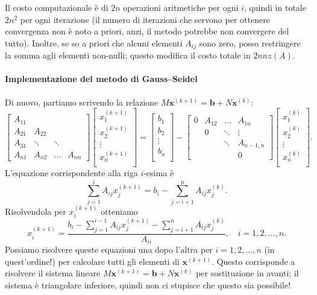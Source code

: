 \documentclass[a4paper]{report}
\theoremstyle{definiton}
\theoremstyle{remark}
\newcommand{\x}{\mathbf{x}}
\renewcommand{\b}{\mathbf{b}}
\begin{document}
Il costo computazionale è di $2n$ operazioni aritmetiche per ogni $i$, quindi in totale $2n^2$ per ogni iterazione (il numero di iterazioni che servono per ottenere convergenza non è noto a priori, anzi, il metodo potrebbe non convergere del tutto). Inoltre, se
 so a priori che alcuni elementi $A_{ij}$ sono zero, posso restringere la somma agli elementi non-nulli; questo modifica il costo totale in $2nnz(A)$.

\paragraph{Implementazione del metodo di Gauss--Seidel}

Di nuovo, partiamo scrivendo la relazione $M\x^{(k+1)} = \b + N\x^{(k)}$:
\[
\begin{bmatrix}
    A_{11}\\
    A_{21} & A_{22}\\
    A_{31}& \ddots & \ddots \\
    A_{n1}& A_{n2} &\dots & A_{nn}
\end{bmatrix}
\begin{bmatrix}
    x_1^{(k+1)}\\
    x_2^{(k+1)}\\
    \vdots\\
    x_n^{(k+1)}\\
\end{bmatrix}
=
\begin{bmatrix}
    b_1\\
    b_2\\
    \vdots\\
    b_n\\
\end{bmatrix}
-
\begin{bmatrix}
     0& A_{12} & \dots & A_{1n}\\
     & 0 & \ddots & \vdots\\
     &  & \ddots & A_{n-1,n}\\
     & &  & 0
\end{bmatrix}
\begin{bmatrix}
    x_1^{(k)}\\
    x_2^{(k)}\\
    \vdots \\
    x_n^{(k)}\\
\end{bmatrix}.
\]
L'equazione corrispondente alla riga $i$-esima è
\[
\sum_{j=1}^i A_{ij}x_j^{(k+1)} = b_i - \sum_{j=i+1}^n A_{ij}x_j^{(k)}. 
\]
Risolvendola per $x_{i}^{(k+1)}$ otteniamo
\begin{equation} \label{GS}
    x_{i}^{(k+1)} = \frac{b_i - \sum_{j=1}^{i-1} A_{ij}x_j^{(k+1)} - \sum_{j=i+1}^n A_{ij}x_j^{(k)} }{A_{ii}}, \quad i=1,2,\dots,n.
\end{equation}
Possiamo risolvere queste equazioni una dopo l'altra per $i=1,2,\dots,n$ (in quest'ordine!) per calcolare tutti gli elementi di $\x^{(k+1)}$. Questo corrisponde a risolvere il sistema lineare $M\x^{(k+1)} = \b + N\x^{(k)}$ per sostituzione in avanti; il sistema è triangolare inferiore, quindi non ci stupisce che questo sia possibile!
\end{document}
